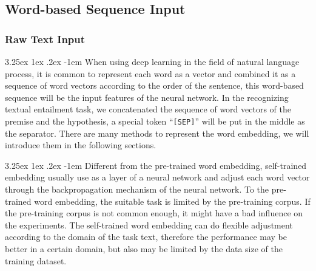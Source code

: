 \documentclass[12pt]{article}
\makeatletter
\newcounter{subsubsubsection}[subsubsection]
\renewcommand\paragraph{\@startsection{paragraph}{5}{\z@}%
  {3.25ex \@plus1ex \@minus.2ex}%
  {-1em}%
  {\normalfont\normalsize\bfseries}}
\makeatother
\begin{document}
\begin{CJK*}{UTF8}{bkai}
\begin{spacing}{1.77}
\subsection{Word-based Sequence Input} \label{section:word_embedding}
\subsubsection{Raw Text Input}
\paragraph{}
When using deep learning in the field of natural language process, it is common to represent each word as a vector and combined it as a sequence of word vectors according to the order of the sentence, this word-based sequence will be the input features of the neural network. In the recognizing textual entailment task, we concatenated the sequence of word vectors of the premise and the hypothesis, a special token ``\texttt{[SEP]}'' will be put in the middle as the separator. There are many methods to represent the word embedding, we will introduce them in the following sections.

\paragraph{}
Different from the pre-trained word embedding, self-trained embedding usually use as a layer of a neural network and adjust each word vector through the backpropagation mechanism of the neural network. To the pre-trained word embedding, the suitable task is limited by the pre-training corpus. If the pre-training corpus is not common enough, it might have a bad influence on the experiments. The self-trained word embedding can do flexible adjustment according to the domain of the task text, therefore the performance may be better in a certain domain, but also may be limited by the data size of the training dataset.


\end{spacing}
\end{CJK*}
\end{document}
